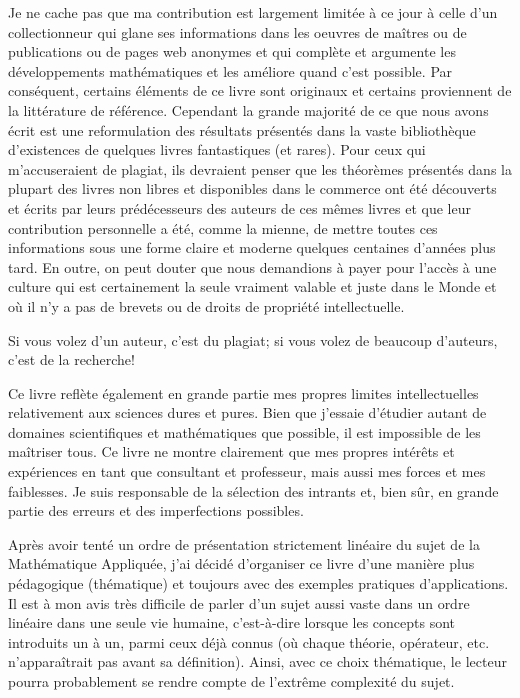 	Je ne cache pas que ma contribution est largement limit\'ee à ce jour à celle d'un collectionneur qui glane ses informations dans les oeuvres de maîtres ou de publications ou de pages web anonymes et qui complète et argumente les d\'eveloppements math\'ematiques et les am\'eliore quand c'est possible. Par cons\'equent, certains \'el\'ements de ce livre sont originaux et certains proviennent de la litt\'erature de r\'ef\'erence. Cependant la grande majorit\'e de ce que nous avons \'ecrit est une reformulation des r\'esultats pr\'esent\'es dans la vaste bibliothèque d'existences de quelques livres fantastiques (et rares). Pour ceux qui m'accuseraient de plagiat, ils devraient penser que les th\'eorèmes pr\'esent\'es dans la plupart des livres non libres et disponibles dans le commerce ont \'et\'e d\'ecouverts et \'ecrits par leurs pr\'ed\'ecesseurs des auteurs de ces mêmes livres et que leur contribution personnelle a \'et\'e, comme la mienne, de mettre toutes ces informations sous une forme claire et moderne quelques centaines d'ann\'ees plus tard. En outre, on peut douter que nous demandions à payer pour l'accès à une culture qui est certainement la seule vraiment valable et juste dans le Monde et où il n'y a pas de brevets ou de droits de propri\'et\'e intellectuelle.
	
	\begin{fquote}Si vous volez d'un auteur, c'est du plagiat; si vous volez de beaucoup d'auteurs, c'est de la recherche!
 	\end{fquote}
	
	Ce livre reflète \'egalement en grande partie mes propres limites intellectuelles relativement aux sciences dures et pures. Bien que j'essaie d'\'etudier autant de domaines scientifiques et math\'ematiques que possible, il est impossible de les maîtriser tous. Ce livre ne montre clairement que mes propres int\'erêts et exp\'eriences en tant que consultant et professeur, mais aussi mes forces et mes faiblesses. Je suis responsable de la s\'election des intrants et, bien sûr, en grande partie des erreurs et des imperfections possibles.

	Après avoir tent\'e un ordre de pr\'esentation strictement lin\'eaire du sujet de la Math\'ematique Appliqu\'ee, j'ai d\'ecid\'e d'organiser ce livre d'une manière plus p\'edagogique (th\'ematique) et toujours avec des exemples pratiques d'applications. Il est à mon avis très difficile de parler d'un sujet aussi vaste dans un ordre lin\'eaire dans une seule vie humaine, c'est-à-dire lorsque les concepts sont introduits un à un, parmi ceux d\'ejà connus (où chaque th\'eorie, op\'erateur, etc. n'apparaîtrait pas avant sa d\'efinition). Ainsi, avec ce choix th\'ematique, le lecteur pourra probablement se rendre compte de l'extrême complexit\'e du sujet.

